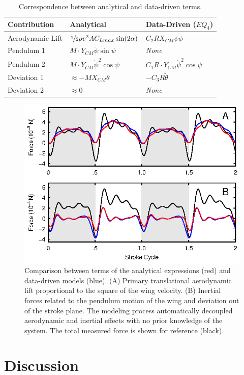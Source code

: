 \documentclass[fleqn,10pt]{wlscirep}
\begin{document}
\begin{table}[ht]
\centering
\begin{tabular}{|l|l|l|}
\hline
{\bf Contribution} & {\bf Analytical} & {\bf Data-Driven ($EQ_4$)}\\
\hline
Aerodynamic Lift & \(\nicefrac{1}{2}\rho v^2AC_{Lmax}\sin(2\alpha)\) & \(C_2RX_{CM}\psi\dot{\phi}\)\\
Pendulum 1 & \(M\cdot Y_{CM}\ddot{\psi}\sin{\psi}\) & \it{None} \\
Pendulum 2 & \(M\cdot Y_{CM}\dot{\psi}^2\cos{\psi}\) & \(C_1R\cdot Y_{CM}\dot{\psi}^2\cos{\psi}\) \\
Deviation 1 & \(\approx-MX_{CM}\ddot{\theta}\) & \(- C_3R\ddot{\theta}\)\\
Deviation 2 & \(\approx0\) & \it{None} \\
\hline
\end{tabular}
\caption{\label{table:eqcorrespondence}Correspondence between analytical and data-driven terms.}
\end{table}

\begin{figure}[ht]
\centering
\includegraphics[width=.48\textwidth]{figures/eq_comparison_PNAS}
\caption{Comparison between terms of the analytical expressions (red) and data-driven models (blue).
  (A) Primary translational aerodynamic lift proportional to the square of the wing velocity. (B)
  Inertial forces related to the pendulum motion of the wing and deviation out of the stroke plane.
  The modeling process automatically decoupled aerodynamic and inertial effects with no prior
  knowledge of the system.  The total measured force is shown for reference (black).}
\label{fig:eqcomparison}
\end{figure}

\section*{Discussion}
\end{document}
